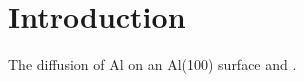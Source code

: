 \section{Introduction}
\label{sec:erm-introduction}

The diffusion of Al on an Al(100) surface and .

\incomplete
